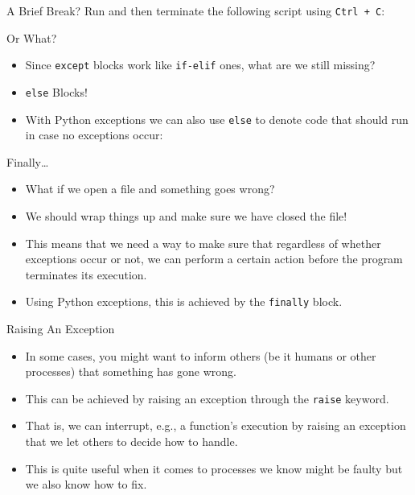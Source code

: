 \documentclass[aspectratio=169, 12pt, xcolor=table]{beamer}
\begin{document}
	\begin{frame}{A Brief Break?}
		Run and then terminate the following script using \texttt{Ctrl + C}:
		
	\end{frame}

	\begin{frame}{Or What?}
		\begin{itemize}
			\item Since \texttt{except} blocks work like \texttt{if-elif} ones, what are we still missing?\pause
			\item \texttt{else} Blocks!
			\item With Python exceptions we can also use \texttt{else} to denote code that should run in case no exceptions occur:
		\end{itemize}
		
	\end{frame}

	\begin{frame}{Finally\ldots}
		\begin{itemize}
			\item What if we open a file and something goes wrong?\pause
			\item We should wrap things up and make sure we have closed the file!
			\item This means that we need a way to make sure that regardless of whether exceptions occur or not, we can perform a certain action before the program terminates its execution.
			\item Using Python exceptions, this is achieved by the \texttt{finally} block.
		\end{itemize}
	\end{frame}

	\begin{frame}{Raising An Exception}
		\begin{itemize}
			\item In some cases, you might want to inform others (be it humans or other processes) that something has gone wrong.
			\item This can be achieved by raising an exception through the \texttt{raise} keyword.
			\item That is, we can interrupt, e.g., a function's execution by raising an exception that we let others to decide how to handle.
			\item This is quite useful when it comes to processes we know might be faulty but we also know how to fix.
		\end{itemize}
	\end{frame}
\end{document}
